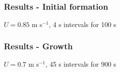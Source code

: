 \documentclass{beamer}
\begin{document}
\begin{frame}
  \frametitle{Results - Initial formation}

  \centering  $U = 0.85$ m s$^{-1}$, 4 s intervals for 100 s

  \resizebox{0.9\textwidth}{!}{}

  
\end{frame}

\begin{frame}
  \frametitle{Results - Growth}

  \centering  $U = 0.7$ m s$^{-1}$, 45 s intervals for 900 s

  \resizebox{0.9\textwidth}{!}{}

  
\end{frame}
\end{document}
